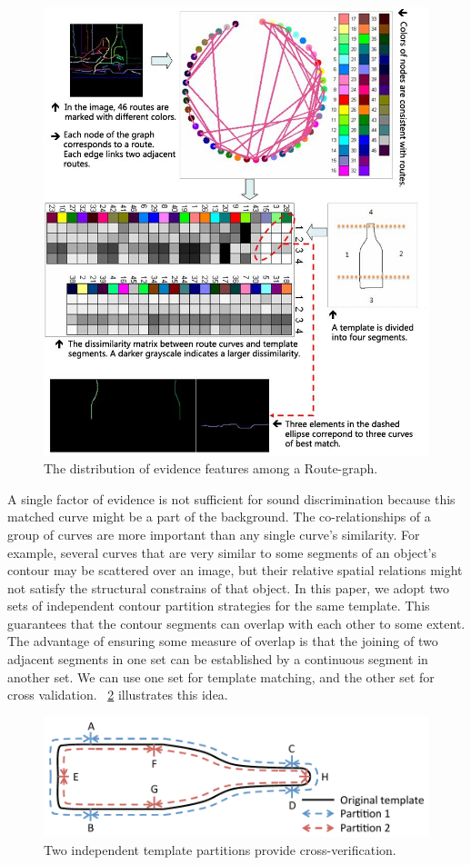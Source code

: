 \documentclass[journal]{IEEEtran}
\begin{document}
\begin{figure}[!t]
\centering
\includegraphics[width=0.9\linewidth]{images/fig15.jpg}
\caption{The distribution of evidence features among a Route-graph.}
\label{fig:15}
\end{figure}

A single factor of evidence is not sufficient for sound discrimination because this matched curve might be a part of the background. 
The co-relationships of a group of curves are more important than any single curve's similarity. 
For example, several curves that are very similar to some segments of an object's contour may be scattered over an image, but their relative spatial relations might not satisfy the structural constrains of that object. 
In this paper, we adopt two sets of independent contour partition strategies for the same template. This guarantees that the contour segments can overlap with each other to some extent. The advantage of ensuring some measure of overlap is that the joining of two adjacent segments in one set can be established by a continuous segment in another set.
We can use one set for template matching, and the other set for cross validation. 
\figurename~\ref{fig:16} illustrates this idea.

\begin{figure}[!t]
\centering
\includegraphics[width=0.7\linewidth]{images/fig16.pdf}
\caption{Two independent template partitions provide cross-verification.}
\label{fig:16}
\end{figure}
\end{document}
